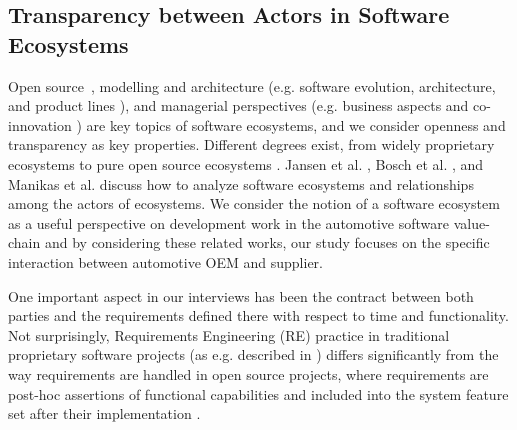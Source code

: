 \subsection{Transparency between Actors in Software Ecosystems}
Open source~\cite{Scacchi2009}, modelling and architecture (e.g. software evolution, architecture, and product lines \cite{Bosch2009}), and managerial perspectives (e.g. business aspects and co-innovation \cite{Jansen2012b}) %
are key topics of software ecosystems, %
and we consider %
openness and transparency %
as %
key properties. %
Different degrees exist, from widely proprietary ecosystems to pure open source ecosystems \cite{Angeren2012,Jansen2012c}.
Jansen et al. \cite{Jansen2012a}, Bosch et al. \cite{Bosch2009}, and Manikas et al. \cite{Manikas2013b} discuss how to analyze software ecosystems and relationships among the actors of ecosystems. 
We consider the notion of a software ecosystem as a useful perspective on development work in the automotive software value-chain \cite{Knauss2014d} and by considering these related works, our study focuses on the specific interaction between automotive OEM and supplier.

One important aspect in our interviews has been the contract between both parties and the requirements defined there with respect to time and functionality. 
Not surprisingly, Requirements Engineering (RE) practice in traditional proprietary software projects (as e.g. described in \cite{Robertson1999,Ruhe2010}) differs significantly from the way requirements are handled in open source projects, where requirements are post-hoc assertions of functional capabilities and included into the system feature set after their implementation \cite{Scacchi2009}.


